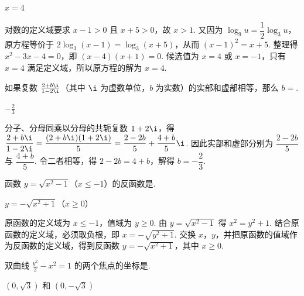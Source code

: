 \documentclass[UTF8,a4paper,oneside,11pt]{ctexbook}
\begin{document}
\begin{answer}
\(x = 4\)
\end{answer}

\begin{solution}
对数的定义域要求 \(x-1>0\) 且 \(x+5>0\)，故 \(x>1\). 又因为 \(\log_9 u=\dfrac{1}{2}\log_3u\)，原方程等价于
\(2\log_3(x-1)=\log_3(x+5)\)，从而 \((x-1)^2=x+5\). 整理得 \(x^2-3x-4=0\)，即 \((x-4)(x+1)=0\). 候选值为 \(x=4\) 或 \(x=-1\)，只有 \(x=4\) 满足定义域，所以原方程的解为 \(x=4\).
\end{solution}

\begin{problem}
如果复数 \(\frac{2 + b\i}{1 - 2\i}\)（其中 \(\i\) 为虚数单位，\(b\) 为实数）的实部和虚部相等，那么 \(b =\)\fillinblank{}.
\end{problem}

\begin{answer}
\(-\frac{2}{3}\)
\end{answer}

\begin{solution}
分子、分母同乘以分母的共轭复数 \(1+2\i\)，得
\(\dfrac{2+b\i}{1-2\i}=\dfrac{(2+b\i)(1+2\i)}{5}=\dfrac{2-2b}{5}+\dfrac{4+b}{5}\i\). 因此实部和虚部分别为 \(\dfrac{2-2b}{5}\) 与 \(\dfrac{4+b}{5}\). 令二者相等，得 \(2-2b=4+b\)，解得 \(b=-\dfrac{2}{3}\).
\end{solution}

\begin{problem}
函数 \(y = \sqrt{x^2 - 1}\)（\(x \leqslant -1\)）的反函数是\fillinblank{}.
\end{problem}

\begin{answer}
\(y = -\sqrt{x^2 + 1}\)（\(x \geqslant 0\)）
\end{answer}

\begin{solution}
原函数的定义域为 \(x\leqslant-1\)，值域为 \(y\geqslant0\). 由 \(y=\sqrt{x^2-1}\) 得 \(x^2=y^2+1\). 结合原函数的定义域，必须取负根，即 \(x=-\sqrt{y^2+1}\). 交换 \(x\)，\(y\)，并把原函数的值域作为反函数的定义域，得到反函数
\(y=-\sqrt{x^2+1}\)，其中 \(x\geqslant0\).
\end{solution}

\begin{problem}
双曲线 \(\frac{y^2}{2} - x^2 = 1\) 的两个焦点的坐标是\fillinblank{}.
\end{problem}

\begin{answer}
\((0, \sqrt{3})\) 和 \((0, -\sqrt{3})\)
\end{answer}
\end{document}
